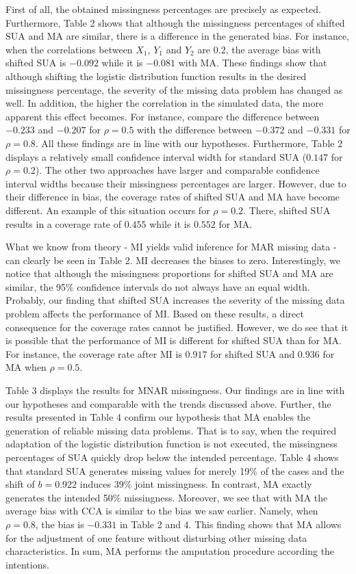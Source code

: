 \documentclass[11pt,a4paper]{article}
\begin{document}
First of all, the obtained missingness percentages are precisely as expected. Furthermore, Table 2 shows that although the missingness percentages of shifted SUA and MA are similar, there is a difference in the generated bias. For instance, when the correlations between $X_1$, $Y_1$ and $Y_2$ are $0.2$, the average bias with shifted SUA is $-0.092$ while it is $-0.081$ with MA. These findings show that although shifting the logistic distribution function results in the desired missingness percentage, the severity of the missing data problem has changed as well. In addition, the higher the correlation in the simulated data, the more apparent this effect becomes. For instance, compare the difference between $-0.233$ and $-0.207$ for $\rho = 0.5$ with the difference between $-0.372$ and $-0.331$ for $\rho = 0.8$. All these findings are in line with our hypotheses. Furthermore, Table 2 displays a relatively small confidence interval width for standard SUA ($0.147$ for $\rho = 0.2$). The other two approaches have larger and comparable confidence interval widths because their missingness percentages are larger. However, due to their difference in bias, the coverage rates of shifted SUA and MA have become different. An example of this situation occurs for $\rho = 0.2$. There, shifted SUA results in a coverage rate of $0.455$ while it is $0.552$ for MA.

What we know from theory - MI yields valid inference for MAR missing data - can clearly be seen in Table 2. MI decreases the biases to zero. Interestingly, we notice that although the missingness proportions for shifted SUA and MA are similar, the 95\% confidence intervals do not always have an equal width. Probably, our finding that shifted SUA increases the severity of the missing data problem affects the performance of MI. Based on these results, a direct consequence for the coverage rates cannot be justified. However, we do see that it is possible that the performance of MI is different for shifted SUA than for MA. For instance, the coverage rate after MI is $0.917$ for shifted SUA and $0.936$ for MA when $\rho = 0.5$.

Table 3 displays the results for MNAR missingness. Our findings are in line with our hypotheses and comparable with the trends discussed above. Further, the results presented in Table 4 confirm our hypothesis that MA enables the generation of reliable missing data problems. That is to say, when the required adaptation of the logistic distribution function is not executed, the missingness percentages of SUA quickly drop below the intended percentage. Table 4 shows that standard SUA generates missing values for merely 19\% of the cases and the shift of $b = 0.922$ induces 39\% joint missingness. In contrast, MA exactly generates the intended 50\% missingness. Moreover, we see that with MA the average bias with CCA is similar to the bias we saw earlier. Namely, when $\rho = 0.8$, the bias is $-0.331$ in Table 2 and 4. This finding shows that MA allows for the adjustment of one feature without disturbing other missing data characteristics. In sum, MA performs the amputation procedure according the intentions.
\end{document}
